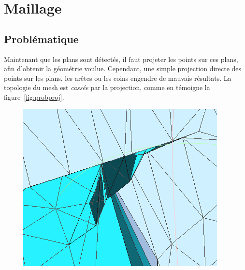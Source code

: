 ﻿\documentclass[12pt, twoside]{article}
\let\oldsection\section
\def\section{\cleardoublepage\oldsection}
\begin{document}
\section{Maillage}
\subsection{Problématique}
Maintenant que les plans sont détectés, il faut projeter les points sur ces plans, afin d'obtenir la géométrie voulue. Cependant, une simple projection directe des points sur les plans, les arêtes ou les coins engendre de mauvais résultats. La topologie du mesh est \textit{cassée} par la projection, comme en témoigne la figure~\ref{fig:probproj}.

\begin{figure}[h]
\centering
\includegraphics[scale=0.55]{prob1.png} \includ
\end{figure}
\end{document}
